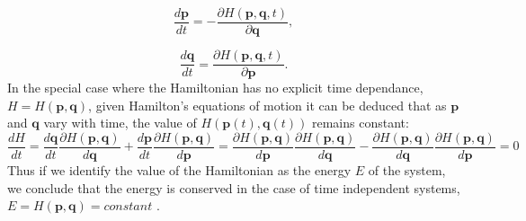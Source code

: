 \begin{equation}
\frac{d \bm{p}}{dt} =-\frac{\partial H(\bm{p},\bm{q},t)}{\partial \bm{q}},
\label{eq:pdot_hamil}
\end{equation}
\par 
\begin{equation}
\frac{d \bm{q}}{dt} =\frac{\partial H(\bm{p},\bm{q},t)}{\partial \bm{p}}.
\label{eq:qdot_hamil}
\end{equation}
In the special case where the Hamiltonian has no explicit time dependance, $H=H(\bm{p},\bm{q})$, given  Hamilton's equations of motion it can be deduced that as $\bm{p}$ and $\bm{q}$ vary with time, the value of $H(\bm{p}(t),\bm{q}(t))$ remains constant:
\begin{equation*}
\frac{dH}{dt}=\frac{d\bm{q}}{dt}\frac{\partial H(\bm{p},\bm{q})}{d\bm{q}}+\frac{d\bm{p}}{dt}\frac{\partial H(\bm{p},\bm{q})}{d\bm{p}}=\frac{\partial H(\bm{p},\bm{q})}{d\bm{p}}\frac{\partial H(\bm{p},\bm{q})}{d\bm{q}}-\frac{\partial H(\bm{p},\bm{q})}{d\bm{q}}\frac{\partial H(\bm{p},\bm{q})}{d\bm{p}}=0
\end{equation*}
Thus if we identify the value of the Hamiltonian as the energy $E$ of the system, we conclude that the energy is conserved in the case of time independent systems, $E=H(\bm{p},\bm{q})=constant$ \cite{ott_chaos_2002}.\par

